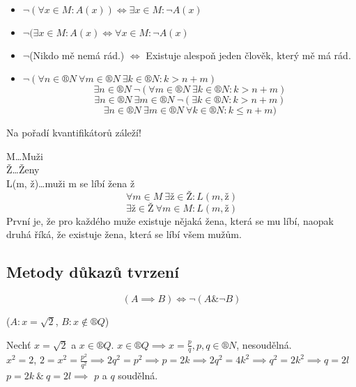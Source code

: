 \documentclass[12pt]{article}					%
\begin{document}
        \begin{priklady}
            \ 
            \begin{itemize}
                \item $\neg (\forall x \in M: A(x)) \Leftrightarrow \exists x \in M: \neg A(x)$
                \item $ \neg (\exists x \in M: A(x) \Leftrightarrow \forall x \in M: \neg A(x)$
                \item $\neg$(Nikdo mě nemá rád.) $\Leftrightarrow$ Existuje alespoň jeden člověk, který mě má rád. 
                \item $\neg(\forall n \in ®N\ \forall m \in ®N\ \exists k \in ®N: k > n+m)$
                    $$ \exists n \in ®N\ \neg(\forall m \in ®N\ \exists k \in ®N: k > n+m) $$
                    $$ \exists n \in ®N\ \exists m \in ®N\ \neg(\exists k \in ®N: k > n+m) $$
                    $$ \exists n \in ®N\ \exists m \in ®N\ \forall k \in ®N: k \leq n+m) $$ 


            \end{itemize}
        \end{priklady}

        \begin{upozorneni}
            Na pořadí kvantifikátorů záleží!
            \begin{prikladyin}
                M…Muži\\
                Ž…Ženy\\
                L(m, ž)…muži m se líbí žena ž
                $$ \forall m \in M\ \exists ž \in Ž: L(m, ž) $$
                $$ \exists ž \in Ž\ \forall m \in M: L(m, ž) $$
                První je, že pro každého muže existuje nějaká žena, která se mu líbí, naopak druhá říká, že existuje žena, která se líbí všem mužům.
            \end{prikladyin}
        \end{upozorneni}

    \subsection{Metody důkazů tvrzení}
        \begin{definice}
            $$ (A \implies B) \Leftrightarrow \neg(A \& \neg B) $$
            \begin{prikladyin}
                ($A: x = \sqrt{2}$, $B: x \notin ®Q$)
                \begin{dukazin}
                    Nechť $x = \sqrt{2}$ a $x \in ®Q$. $x \in ®Q \implies x = \frac{p}{q}, p,q \in ®N$, nesoudělná.\\
                $x^2 = 2$,  $2 = x^2 = \frac{p^2}{q^2} \implies 2q^2 = p^2 \implies p = 2k \implies 2q^2 = 4k^2 \implies q^2 = 2k^2 \implies q = 2l$\\
                    $p=2k\ \&\ q=2l \implies$ $p$ a $q$ soudělná. \lightning 
                \end{dukazin}
                    
            \end{prikladyin}
        \end{definice}
\end{document}
